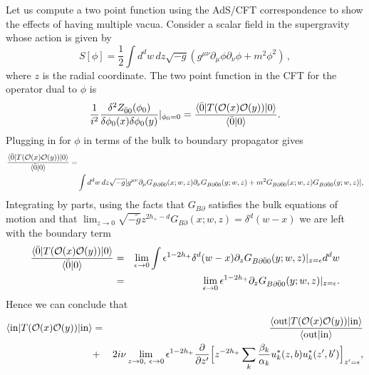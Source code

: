 \documentclass[a4paper,aps,prd,preprintnumbers,groupedaddress]{revtex4}
\begin{document}
Let us compute a two point function using the AdS/CFT correspondence to show the effects of having multiple vacua. Consider a scalar field in the
supergravity whose action is given by
\begin{equation} \label{scalar action}
S[\phi] = \frac{1}{2} \int d^d w \, dz \sqrt{-g} (g^{\mu \nu} \partial _\mu \phi \partial _\nu \phi +m^2 \phi^2)  \, ,
\end{equation}
where $z$ is the radial coordinate.
The two point function in the CFT for the operator dual to $\phi$ is
\begin{equation}
\frac{1}{i^2} \frac{\delta ^2 Z_{\bar{0} 0} (\phi_0) } {\delta \phi_0 (x) \delta \phi_0 (y) } |_{\phi_0=0} = \frac{\langle \bar{0} | T({\cal
O}(x) {\cal O} (y) ) | 0 \rangle }{\langle \bar{0} | 0 \rangle } .
\end{equation}
Plugging in for $\phi$ in terms of the bulk to boundary propagator gives
\begin{eqnarray}
\frac{\langle \bar{0} | T({\cal O}(x) {\cal O} (y) ) | 0 \rangle }{\langle \bar{0} | 0 \rangle } = & \ \ \ \ \ \  \ \ \ \ \nonumber \\
&\int
d^d w \, dz  \sqrt{-g} [ g^{\mu \nu} \partial_{\mu} G_{B\partial\bar{0}0} (x;w,z) \partial_\nu
G_{B\partial\bar{0}0} (y;w,z) +m^2 G_{B\partial\bar{0}0} (x;w,z) G_{B\partial\bar{0}0} (y;w,z) ] ,
\end{eqnarray}
Integrating by parts, using the facts that $G_{B \partial}$ satisfies the bulk equations
of motion and that $\lim_{z\rightarrow0} \sqrt{-\tilde{g}} z^{2h_+ - d} G_{B \partial}(x;w,z)=\delta^d (w-x)$ we are left with the boundary
term
\begin{eqnarray}
\frac{\langle \bar{0} | T({\cal O}(x) {\cal O} (y) ) | 0 \rangle }{\langle \bar{0} | 0 \rangle } &=& \lim_{\epsilon\rightarrow0} \int
\epsilon^{1-2h_+} \delta^d(w-x) \partial_z G_{B \partial \bar{0} 0}(y;w,z) |_{z=\epsilon} d^d w \nonumber \\
&=& \lim_{\epsilon\rightarrow0} \epsilon^{1-2h_+} \partial_z G_{B \partial \bar{0} 0}(y;w,z) |_{z=\epsilon} .
\end{eqnarray}
Hence we can conclude that
\begin{eqnarray}
\langle \mathrm{in} | T({\cal O}(x) {\cal O} (y) ) | \mathrm{{ in}} \rangle &=& \frac{\langle \mathrm{{out}} | T({\cal O}(x) {\cal O} (y) ) | \mathrm{{in}} \rangle }{\langle \mathrm{{out}} | \mathrm{in}
\rangle } \nonumber \\
 &+&
2 i \nu \lim_{z\rightarrow 0, \ \epsilon\rightarrow 0} \epsilon^{1-2h_+} \frac{\partial}{\partial z'} \Bigl[
z^{-2h_+} \sum_k \frac{\beta_k}{\alpha_k} u_k ^* (z,b) u_k ^* (z',b') \Bigr]_{z'=\epsilon} ,
\label{master}
\end{eqnarray}
\end{document}
